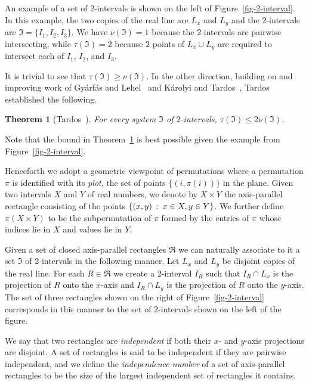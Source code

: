 \documentclass[
final
, nomarks
]{dmtcs-episciences}
\newtheorem{theorem}{Theorem}
\begin{document}
An example of a set of $2$-intervals is shown on the left of Figure~\ref{fig-2-interval}. In this example, the two copies of the real line are $L_x$ and $L_y$ and the $2$-intervals are $\mathfrak{I}=\{I_1,I_2,I_3\}$. We have $\nu(\mathfrak{I})=1$ because the $2$-intervals are pairwise intersecting, while $\tau(\mathfrak{I})=2$ because $2$ points of $L_x\cup L_y$ are required to intersect each of $I_1$, $I_2$, and $I_3$.

It is trivial to see that $\tau(\mathfrak{I})\ge \nu(\mathfrak{I})$. In the other direction, building on and improving work of Gy\'arf\'as and Lehel~\cite{gyarfas:a-helly-type-pr:} and K\'arolyi and Tardos~\cite{karolyi:on-point-covers:}, Tardos established the following.

\begin{theorem}[Tardos~\cite{tardos:transversals-of:}]
\label{thm-2int-transversal}
For every system $\mathfrak{I}$ of $2$-intervals, $\tau(\mathfrak{I})\le 2\nu(\mathfrak{I})$.
\end{theorem}

Note that the bound in Theorem~\ref{thm-2int-transversal} is best possible given the example from Figure~\ref{fig-2-interval}.

Henceforth we adopt a geometric viewpoint of permutations where a permutation $\pi$ is identified with its \emph{plot}, the set of points $\{(i,\pi(i))\}$ in the plane. Given two intervals $X$ and $Y$ of real numbers, we denote by $X\times Y$ the axis-parallel rectangle consisting of the points $\{(x,y)\::\: x\in X, y\in Y\}$. We further define $\pi(X\times Y)$ to be the subpermutation of $\pi$ formed by the entries of $\pi$ whose indices lie in $X$ and values lie in $Y$.

Given a set of closed axis-parallel rectangles $\mathfrak{R}$ we can naturally associate to it a set $\mathfrak{I}$ of $2$-intervals in the following manner. Let $L_x$ and $L_y$ be disjoint copies of the real line. For each $R\in\mathfrak{R}$ we create a $2$-interval $I_R$ such that $I_R\cap L_x$ is the projection of $R$ onto the $x$-axis and $I_R\cap L_y$ is the projection of $R$ onto the $y$-axis. The set of three rectangles shown on the right of Figure~\ref{fig-2-interval} corresponds in this manner to the set of $2$-intervals shown on the left of the figure.

We say that two rectangles are {\it independent\/} if both their $x$- and $y$-axis projections are disjoint. A set of rectangles is said to be independent if they are pairwise independent, and we define the \emph{independence number} of a set of axis-parallel rectangles to be the size of the largest independent set of rectangles it contains.
\end{document}
